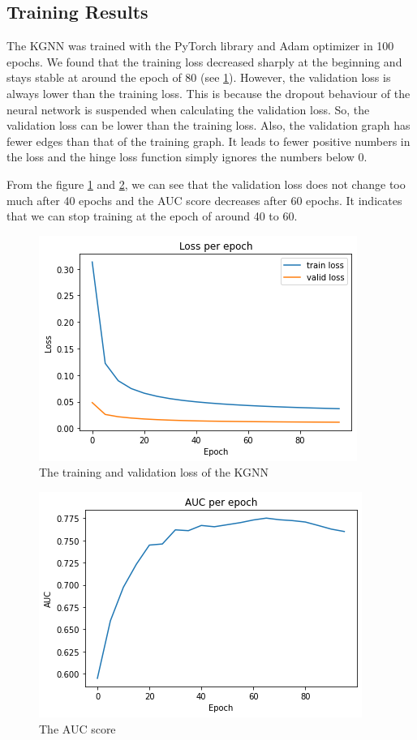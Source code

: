 \documentclass[11pt,twoside]{report}
\begin{document}
\subsection{Training Results}
The KGNN was trained with the PyTorch library and Adam optimizer in 100 epochs. We found that the training loss decreased sharply at the beginning and stays stable at around the epoch of 80 (see \ref{fig:training_loss}). However, the validation loss is always lower than the training loss. This is because the dropout behaviour of the neural network is suspended when calculating the validation loss. So, the validation loss can be lower than the training loss. Also, the validation graph has fewer edges than that of the training graph. It leads to fewer positive numbers in the loss and the hinge loss function simply ignores the numbers below 0. 

From the figure \ref{fig:training_loss} and \ref{fig:auc}, we can see that the validation loss does not change too much after 40 epochs and the AUC score decreases after 60 epochs. It indicates that we can stop training at the epoch of around 40 to 60.

\begin{figure}[H]
    \centering
    \includegraphics[scale=0.9]{loss.png}
    \caption{The training and validation loss of the KGNN}
    \label{fig:training_loss}
\end{figure}

\begin{figure}[H]
    \centering
    \includegraphics[scale=0.9]{auc.png}
    \caption{The AUC score}
    \label{fig:auc}
\end{figure}
\end{document}
